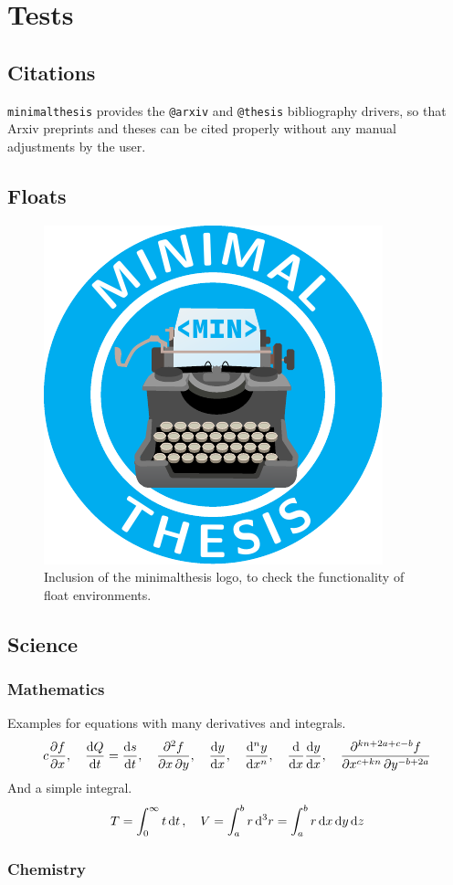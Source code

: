 \documentclass{./class/minimalthesis}
\begin{document}
	\mtGenerateTitlepage
	\mtGenerateTOC
	
	\chapter{Tests}
		\section{Citations}
			\verb|minimalthesis| provides the \verb|@arxiv| \cite{arxivExample} and \verb|@thesis| \cite{thesisExample} bibliography drivers, so that Arxiv preprints and theses can be cited properly without any manual adjustments by the user.
			
		\section{Floats}
			\begin{figure}[h!]
				\centering
				\includegraphics[]{./class/img/minimalthesis_logo.pdf}
				\caption{Inclusion of the minimalthesis logo, to check the functionality of float environments.}
			\end{figure}
		
		\newpage
		\section{Science}	
			\subsection{Mathematics}
				Examples for equations with many derivatives and integrals.
				\begin{align*}{c}
					\pdv{f}{x}, \quad \odv{Q}{t}=\odv{s}{t}, \quad \pdv{f}{x,y}, \quad 
					\derivset{\odv}[switch-*=false] \odv{y}{x}, \quad \odv[order=n]{y}{x}, \quad
					\derivset{\odv}[] \odv*{\odv{y}{x}}{x}, \quad 
					\derivset{\pdv}[sort-method={sign,symbol,abs}] \pdv[order={c+kn,-b+2a}]{f}{x,y}
				\end{align*}
				And a simple integral.
				\begin{align*}
					T = \int_{0}^{\infty}t\dd{t}, \quad V = \int_{a}^{b} r \dd[3]{r} = \int_{a}^{b} r \odif{x,y,z}
				\end{align*}
				
			\subsection{Chemistry}
				\\
	
	\mtGenerateBibliography
\end{document}
